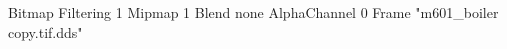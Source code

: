 {Bitmap
	{Filtering 1}
	{Mipmap 1}
	{Blend none}
	{AlphaChannel 0}
	{Frame "m601_boiler copy.tif.dds"}
}
